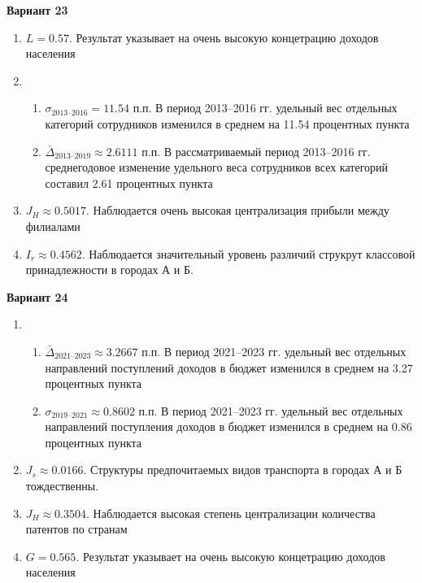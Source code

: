 \documentclass{article}
\begin{document}
\textbf{Вариант 23}
\begin{enumerate}
\item $L= 0.57$. Результат указывает на очень высокую концетрацию доходов населения
\item \begin{enumerate} \item $\sigma_\text{2013--2016}= 11.54$ п.п. В период 2013--2016 гг. удельный вес отдельных категорий сотрудников изменился в среднем на 11.54 процентных пункта
\item $\bar\Delta_\text{2013--2019}\approx 2.6111$ п.п. В рассматриваемый период 2013--2016 гг. среднегодовое изменение удельного веса сотрудников всех категорий составил 2.61 процентных пункта\end{enumerate}
\item $J_H \approx 0.5017$. Наблюдается очень высокая централизация прибыли между филиалами
\item $I_r\approx 0.4562$. Наблюдается значительный уровень различий струкрут классовой принадлежности в городах А и Б.
\end{enumerate}

\textbf{Вариант 24}
\begin{enumerate}
\item \begin{enumerate} \item $\bar\Delta_\text{2021--2023}\approx 3.2667$ п.п. В период 2021--2023 гг. удельный вес отдельных направлений поступлений доходов в бюджет изменился в среднем на 3.27 процентных пункта
\item $\sigma_\text{2019--2021}\approx 0.8602$ п.п. В период 2021--2023 гг. удельный вес отдельных направлений поступления доходов в бюджет изменился в среднем на 0.86 процентных пункта\end{enumerate}
\item $J_s\approx 0.0166$. Структуры предпочитаемых видов транспорта в городах А и Б тождественны.
\item $J_H \approx 0.3504$. Наблюдается высокая степень централизации количества патентов по странам
\item $G= 0.565$. Результат указывает на очень высокую концетрацию доходов населения
\end{enumerate}
\end{document}
